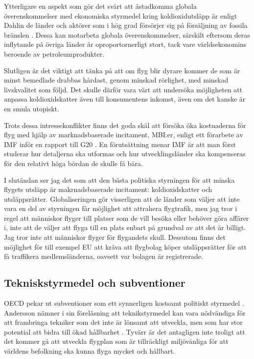 \documentclass{article}
\begin{document}
Ytterligare en aspekt som gör det svårt att åstadkomma globala överenskommelser med ekonomiska styrmedel kring koldioxidutsläpp är enligt Dahlin de länder och aktörer som i hög grad försörjer sig på försäljning av fossila bränslen . Dessa kan motarbeta globala överenskommelser, särskilt eftersom deras inflytande på övriga länder är oproportornerligt stort, tack vare världsekonomins beroende av petroleumprodukter.

Slutligen är det viktigt att tänka på att om flyg blir dyrare kommer de som är minst bemedlade drabbas hårdast, genom minskad rörlighet, med minskad livskvalitet som följd. Det skulle därför vara värt att undersöka möjligheten att anpassa koldioxidskatter även till konsumentens inkomst, även om det kanske är en smula utopiskt.


Trots dessa intressekonflikter finns det goda skäl att försöka öka kostnaderna för flyg med hjälp av marknadsbaserade incitament, MBI:er, enligt ett förarbete av IMF inför en rapport till G20 . En förutsättning menar IMF är att man först studerar hur detaljerna ska utformas och hur utvecklingsländer ska kompenseras för den relativt höga bördan de skulle få bära.

I slutändan ser jag det som att den bästa politiska styrningen för att minska flygets utsläpp är makrnadsbaserade incitament: koldioxidskatter och utsläppsrätter. Globaliseringen gör visserligen att de länder som väljer att inte vara en del av styrningen får möjlighet att attrahera flygtrafik, men jag tror i regel att människor flyger till platser som de vill besöka eller behöver göra affärer i, inte att de väljer att flyga till en plats enbart på grundval av att det är billigt. Jag tror inte att människor flyger för flygandets skull. Dessutom finns det möjlighet för till exempel EU att kräva att flygbolag köper utsläppsrätter för att få traffikera medlemsländerna, oavsett var bolagen är registrerade.

\subsection{Tekniskstyrmedel och subventioner}

OECD pekar ut subventioner som ett synnerligen kostsamt politiskt styrmedel . Andersson nämner i sin föreläsning att teknikstyrmedel kan vara nödvändiga för att frambringa tekniker som det inte är lönsamt att utveckla, men som har stor potential att bidra till ökad hållbarhet . Tyvärr är det antagligen inte troligt att det kommer gå att utveckla flygplan som är tillräckligt miljövänliga för att världens befolkning ska kunna flyga mycket och hållbart.
\end{document}

